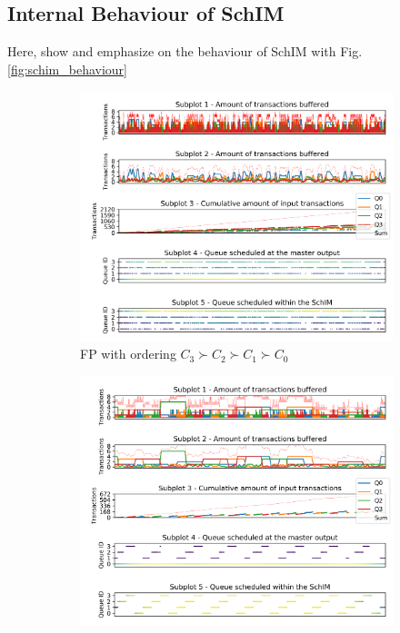   \subsection{Internal Behaviour of SchIM}
    Here, show and emphasize on the behaviour of SchIM with Fig.\ref{fig:schim_behaviour}
    \begin{figure}
      \begin{subfigure}{.31\textwidth}
        \centering
        \includegraphics[scale=0.31]{images/iladata_fp_3_0f0e0d0c_20_3.png}
        \caption{FP with ordering $C_{3} \succ C_{2} \succ C_{1} \succ C_{0}$}
        \label{fig:schim_behaviour_fp}
      \end{subfigure}
      \hfill
      \begin{subfigure}{.31\textwidth}
        \centering
        \includegraphics[scale=0.31]{images/iladata_tdma_3_3_512_512_1.png}

\end{subfigure}
\end{figure}
